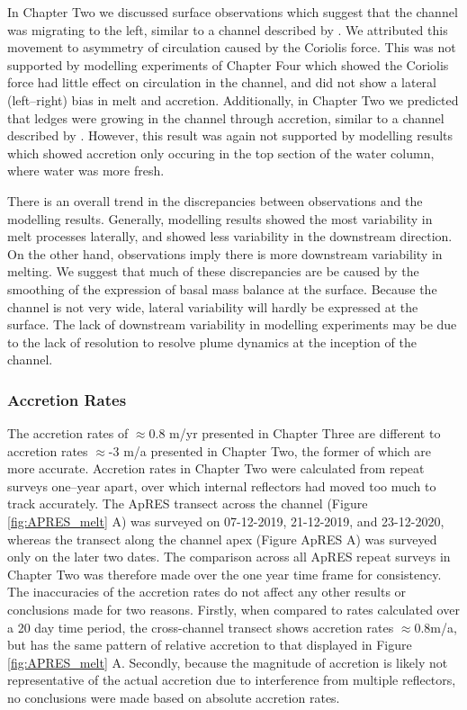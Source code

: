 In Chapter Two we discussed surface observations which suggest that the channel was migrating to the left, similar to a channel described by \cite{chartrand2020basal}. We attributed this movement to asymmetry of circulation caused by the Coriolis force. This was not supported by modelling experiments of Chapter Four which showed the Coriolis force had little effect on circulation in the channel, and did not show a lateral (left--right) bias in melt and accretion. Additionally, in Chapter Two we predicted that ledges were growing in the channel through accretion, similar to a channel described by \cite{dutrieux2014basal}. However, this result was again not supported by modelling results which showed accretion only occuring in the top section of the water column, where water was more fresh.

There is an overall trend in the discrepancies between observations and the modelling results. Generally, modelling results showed the most variability in melt processes laterally, and showed less variability in the downstream direction. On the other hand, observations imply there is more downstream variability in melting.
We suggest that much of these discrepancies are be caused by the smoothing of the expression of basal mass balance at the surface. Because the channel is not very wide, lateral variability will hardly be expressed at the surface. The lack of downstream variability in modelling experiments may be due to the lack of resolution to resolve plume dynamics at the inception of the channel.

\subsubsection{Accretion Rates}

The accretion rates of $\approx$0.8 m/yr presented in Chapter Three are different to accretion rates $\approx$-3 m/a presented in Chapter Two, the former of which are more accurate. Accretion rates in Chapter Two were calculated from repeat surveys one--year apart, over which internal reflectors had moved too much to track accurately. The ApRES transect across the channel (Figure \ref{fig:APRES_melt} A) was surveyed on 07-12-2019, 21-12-2019, and 23-12-2020, whereas the transect along the channel apex (Figure ApRES A) was surveyed only on the later two dates. The comparison across all ApRES repeat surveys in Chapter Two was therefore made over the one year time frame for consistency.  The inaccuracies of the accretion rates do not affect any other results or conclusions made for two reasons. Firstly, when compared to rates calculated over a 20 day time period, the cross-channel transect shows accretion rates $\approx$0.8m/a, but has the same pattern of relative accretion to that displayed in Figure \ref{fig:APRES_melt} A.  Secondly, because the magnitude of accretion is likely not representative of the actual accretion due to interference from multiple reflectors, no conclusions were made based on absolute accretion rates.



